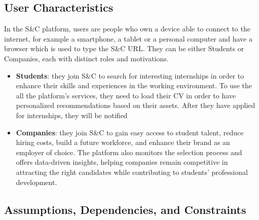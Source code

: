 \documentclass{article}
\begin{document}
\subsection{User Characteristics}
In the S\&C platform, users are people who own a device able to connect to the internet, for example a smartphone, a tablet or a personal computer and have a browser which is used to type the S\&C URL.  They can be either Students or Companies, each with distinct roles and motivations.
\begin{itemize}
    \item \textbf{Students}: they join S\&C to search for interesting internships in order to enhance their skills and experiences in the working environment. To use the all the platform's services, they need to load their CV in order to have personalized recommendations based on their assets. After they have applied for internships, they will be notified
    \item \textbf{Companies}: they join S\&C to gain easy access to student talent, reduce hiring costs, build a future workforce, and enhance their brand as an employer of choice. The platform also monitors the selection process and offers data-driven insights, helping companies remain competitive in attracting the right candidates while contributing to students’ professional development.
\end{itemize}
\subsection{Assumptions, Dependencies, and Constraints}
\end{document}
